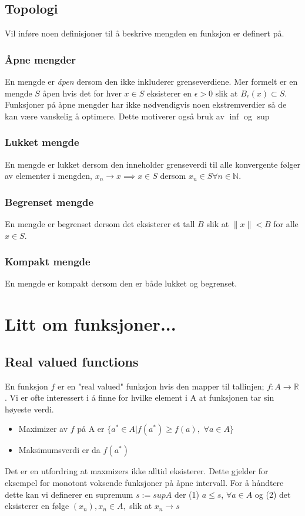 \subsection{Topologi}
Vil inføre noen definisjoner til å beskrive mengden en funksjon er definert på. 
\subsubsection{Åpne mengder}
En mengde er \textit{åpen} dersom den ikke inkluderer grenseverdiene. Mer formelt er en mengde $S$ åpen hvis det for hver $x \in S$ eksisterer en $\epsilon >0$ slik at $B_{\epsilon}(x) \subset S$. Funksjoner på åpne mengder har ikke nødvendigvis noen ekstremverdier så de kan være vanskelig å optimere. Dette motiverer også bruk av $\inf$ og $\sup$
\subsubsection{Lukket mengde}
En mengde er lukket dersom den inneholder grenseverdi til alle konvergente følger av elementer i mengden, $x_n \to x \implies x \in S$ dersom $x_n \in S \forall n \in \mathbb{N}$.
\subsubsection{Begrenset mengde}
En mengde er begrenset dersom det eksisterer et tall $B$ slik at $\lVert x \rVert < B$ for alle $x \in S$.
\subsubsection{Kompakt mengde}
En mengde er kompakt dersom den er både lukket og begrenset. 
\section{Litt om funksjoner...}
\subsection{Real valued functions}
En funksjon $f$ er en "real valued" funksjon hvis den mapper til tallinjen; $f:A\rightarrow \mathbb{R}$. Vi er ofte interessert i å finne for hvilke element i A at funksjonen tar sin høyeste verdi. 
\begin{itemize}
\item Maximizer av $f$ på A er $\{a^*\in A|f(a^*)\geqslant f(a),$ $ \forall a \in A \}$ 
\item Maksimumsverdi er da $f(a^*)$
\end{itemize}
Det er en utfordring at maxmizers ikke alltid eksisterer. Dette gjelder for eksempel for monotont voksende funksjoner på åpne intervall. For å håndtere dette kan vi definerer en supremum $ s := sup A $ der (1) $a \leq s$, $ \forall a \in A$  og (2) det eksisterer en følge  $(x_n), x_n \in A,$ slik at $ x_n \rightarrow s$
